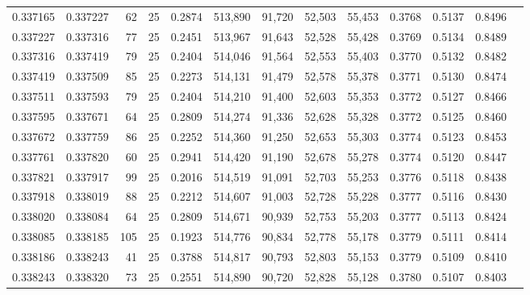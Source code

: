 \begin{tabular}{rrrrrrrrrrrrr}
0.337165 & 0.337227 &    62 &  25 &                                     0.2874 & 513,890 &  91,720 &  52,503 &  55,453 & 0.3768 & 0.5137 & 0.8496 \\
0.337227 & 0.337316 &    77 &  25 &                                     0.2451 & 513,967 &  91,643 &  52,528 &  55,428 & 0.3769 & 0.5134 & 0.8489 \\
0.337316 & 0.337419 &    79 &  25 &                                     0.2404 & 514,046 &  91,564 &  52,553 &  55,403 & 0.3770 & 0.5132 & 0.8482 \\
0.337419 & 0.337509 &    85 &  25 &                                     0.2273 & 514,131 &  91,479 &  52,578 &  55,378 & 0.3771 & 0.5130 & 0.8474 \\
0.337511 & 0.337593 &    79 &  25 &                                     0.2404 & 514,210 &  91,400 &  52,603 &  55,353 & 0.3772 & 0.5127 & 0.8466 \\
0.337595 & 0.337671 &    64 &  25 &                                     0.2809 & 514,274 &  91,336 &  52,628 &  55,328 & 0.3772 & 0.5125 & 0.8460 \\
0.337672 & 0.337759 &    86 &  25 &                                     0.2252 & 514,360 &  91,250 &  52,653 &  55,303 & 0.3774 & 0.5123 & 0.8453 \\
0.337761 & 0.337820 &    60 &  25 &                                     0.2941 & 514,420 &  91,190 &  52,678 &  55,278 & 0.3774 & 0.5120 & 0.8447 \\
0.337821 & 0.337917 &    99 &  25 &                                     0.2016 & 514,519 &  91,091 &  52,703 &  55,253 & 0.3776 & 0.5118 & 0.8438 \\
0.337918 & 0.338019 &    88 &  25 &                                     0.2212 & 514,607 &  91,003 &  52,728 &  55,228 & 0.3777 & 0.5116 & 0.8430 \\
0.338020 & 0.338084 &    64 &  25 &                                     0.2809 & 514,671 &  90,939 &  52,753 &  55,203 & 0.3777 & 0.5113 & 0.8424 \\
0.338085 & 0.338185 &   105 &  25 &                                     0.1923 & 514,776 &  90,834 &  52,778 &  55,178 & 0.3779 & 0.5111 & 0.8414 \\
0.338186 & 0.338243 &    41 &  25 &                                     0.3788 & 514,817 &  90,793 &  52,803 &  55,153 & 0.3779 & 0.5109 & 0.8410 \\
0.338243 & 0.338320 &    73 &  25 &                                     0.2551 & 514,890 &  90,720 &  52,828 &  55,128 & 0.3780 & 0.5107 & 0.8403 \\

\end{tabular}
